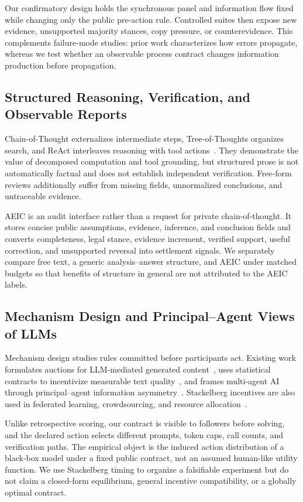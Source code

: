 Our confirmatory design holds the synchronous panel and information flow fixed while changing only the public pre-action rule. Controlled suites then expose new evidence, unsupported majority stances, copy pressure, or counterevidence. This complements failure-mode studies: prior work characterizes how errors propagate, whereas we test whether an observable process contract changes information production before propagation.

\subsection{Structured Reasoning, Verification, and Observable Reports}
Chain-of-Thought externalizes intermediate steps, Tree-of-Thoughts organizes search, and ReAct interleaves reasoning with tool actions~\cite{wei2022chain,yao2024tree,yao2023react}. They demonstrate the value of decomposed computation and tool grounding, but structured prose is not automatically factual and does not establish independent verification. Free-form reviews additionally suffer from missing fields, unnormalized conclusions, and untraceable evidence.

AEIC is an audit interface rather than a request for private chain-of-thought. It stores concise public assumptions, evidence, inference, and conclusion fields and converts completeness, legal stance, evidence increment, verified support, useful correction, and unsupported reversal into settlement signals. We separately compare free text, a generic analysis--answer structure, and AEIC under matched budgets so that benefits of structure in general are not attributed to the AEIC labels.

\subsection{Mechanism Design and Principal--Agent Views of LLMs}
Mechanism design studies rules committed before participants act. Existing work formulates auctions for LLM-mediated generated content~\cite{duetting2023mechanism}, uses statistical contracts to incentivize measurable text quality~\cite{saig2024incentivizing}, and frames multi-agent AI through principal--agent information asymmetry~\cite{rauba2025principal,kaltenpoth2025agency}. Stackelberg incentives are also used in federated learning, crowdsourcing, and resource allocation~\cite{fu2024stackelberg,guo2023incentive,wang2024incentive}.

Unlike retrospective scoring, our contract is visible to followers before solving, and the declared action selects different prompts, token caps, call counts, and verification paths. The empirical object is the induced action distribution of a black-box model under a fixed public contract, not an assumed human-like utility function. We use Stackelberg timing to organize a falsifiable experiment but do not claim a closed-form equilibrium, general incentive compatibility, or a globally optimal contract.

